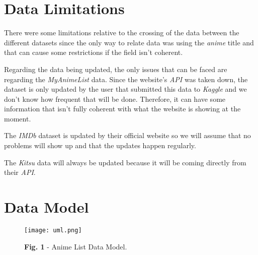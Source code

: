 \documentclass[twocolumn,twoside,11pt,a4paper]{article}
\begin{document}
\section{Data Limitations}\label{limitations}
There were some limitations relative to the crossing of the data between the different datasets since the only way to relate data was using the \textit{anime} title and that can cause some restrictions if the field isn’t coherent.
\par
Regarding the data being updated, the only issues that can be faced are regarding the \textit{MyAnimeList} data. Since the website’s \textit{API} was taken down, the dataset is only updated by the user that submitted this data to \textit{Kaggle} and we don’t know how frequent that will be done. Therefore, it can have some information that isn’t fully coherent with what the website is showing at the moment.
\par
 The \textit{IMDb} dataset is updated by their official website so we will assume that no problems will show up and that the updates happen regularly. 
\par
The \textit{Kitsu} data will always be updated because it will be coming directly from their \textit{API}.

\section{Data Model} \label{model}
 \begin{figure}[H]
\texttt{[image: uml.png]}\centering
\caption*{\textbf{Fig. 1} - Anime List Data Model.}
\label{img1}
\end{figure}
\end{document}

